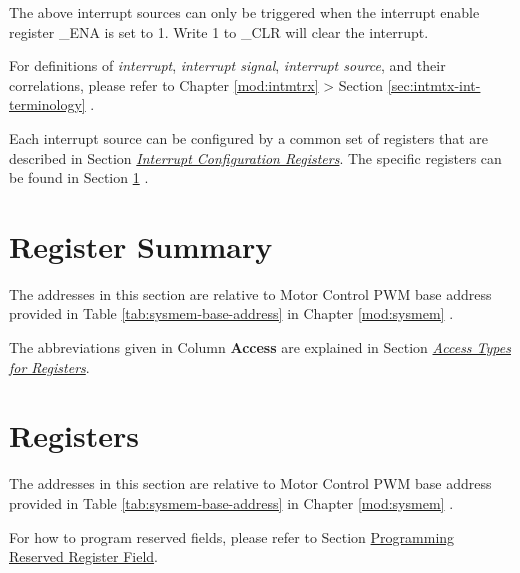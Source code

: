\documentclass[main\_\_EN.tex]{subfiles}
\begin{document}
The above interrupt sources can only be triggered when the interrupt enable register \_ENA is set to 1. Write 1 to \_CLR will clear the interrupt.

\begin{tiplisting}
For definitions of \textit{interrupt}, \textit{interrupt signal}, \textit{interrupt source}, and their correlations, please refer to Chapter \ref{mod:intmtrx} \textit{} > Section \ref{sec:intmtx-int-terminology} \textit{}.
\end{tiplisting}

Each interrupt source can be configured by a common set of registers that are described in Section \hyperref[interrupt-config-registers]{\textit{Interrupt Configuration Registers}}. The specific registers can be found in Section \ref{sec:mcpwm-reg-summ} \textit{}.




\newpage
\hypertarget{mcpwm-reg-summ}{}
\section{Register Summary}
\label{sec:mcpwm-reg-summ}

The addresses in this section are relative to Motor Control PWM base address provided in Table \ref{tab:sysmem-base-address} in Chapter \ref{mod:sysmem} \textit{}.

The abbreviations given in Column \textbf{Access} are explained in Section \hyperref[glossary-access-types]{\textit{Access Types for Registers}}.






\newpage
\section{Registers}

The addresses in this section are relative to Motor Control PWM base address provided in Table \ref{tab:sysmem-base-address} in Chapter \ref{mod:sysmem} \textit{}.

For how to program reserved fields, please refer to Section \hyperref[programming-reserved-field]{Programming Reserved Register Field}.


\end{document}
